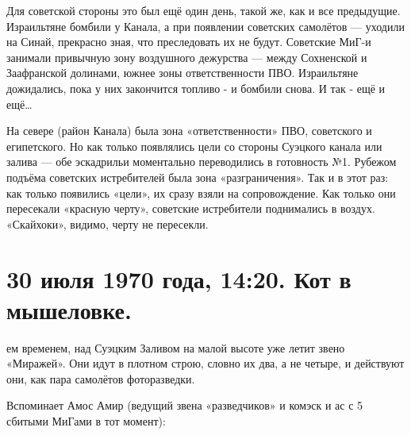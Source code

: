 Для советской стороны это был ещё один день, такой же, как и все предыдущие. Израильтяне бомбили у Канала, а при появлении советских самолётов — уходили на Синай, прекрасно зная, что преследовать их не будут. Советские МиГ-и занимали привычную зону воздушного дежурства — между Сохненской и Заафранской долинами, южнее зоны ответственности ПВО. Израильтяне дожидались, пока у них закончится топливо - и бомбили снова. И так - ещё и ещё…

На севере (район Канала) была зона «ответственности» ПВО, советского и египетского. Но как только появлялись цели со стороны Суэцкого канала или залива — обе эскадрильи моментально переводились в готовность №1. Рубежом подъёма советских истребителей была зона «разграничения». Так и в этот раз: как только появились «цели», их сразу взяли на сопровождение. Как только они пересекали «красную черту», советские истребители поднимались в воздух. «Скайхоки», видимо, черту не пересекли.

\section{30 июля 1970 года, 14:20. Кот в мышеловке.}

ем временем, над Суэцким Заливом на малой высоте уже летит звено «Миражей». Они идут в плотном строю, словно их два, а не четыре, и действуют они, как пара самолётов фоторазведки.

Вспоминает Амос Амир (ведущий звена «разведчиков» и комэск и ас с 5 сбитыми МиГами в тот момент):

